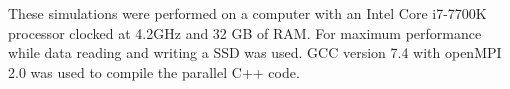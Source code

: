 \documentclass[preprint,10pt,authoryear,review]{elsarticle}
\begin{document}
\begin{linenumbers}

These simulations were performed 
on a computer with an Intel Core i7-7700K processor clocked at 4.2GHz and 
32 GB of RAM. For maximum performance while data reading and writing a SSD 
was used. GCC version 7.4 with openMPI 2.0 was used to compile 
the parallel C++ code.






\end{linenumbers}
\end{document}
